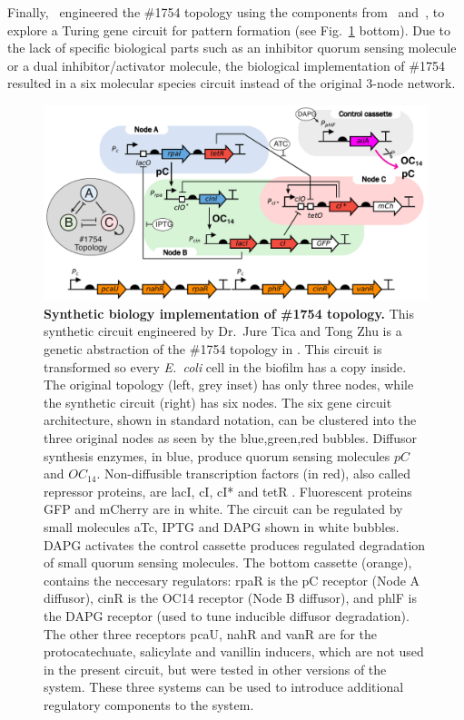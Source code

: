 Finally,~\cite{Tica2020} engineered the \#1754 topology using the components from~\cite{Meyer2019} and~\cite{Du2020}, to explore a Turing gene circuit for pattern formation (see Fig.~\ref{fig:synthetic circuit} bottom).
Due to the lack of specific biological parts such as an inhibitor quorum sensing molecule or a dual inhibitor/activator molecule, the biological implementation of \#1754 resulted in a six molecular species circuit instead of the original 3-node network.

\begin{figure}[H]
    \centering
    \includegraphics[width=1\textwidth]{chapters/Chapter 2/synthetic circuit2}
    \caption{\textbf{Synthetic biology implementation of \#1754 topology.} This synthetic circuit
    engineered by Dr.~Jure Tica and Tong Zhu is a genetic abstraction of the \#1754 topology in \cite{Scholes2019}.
    This circuit is transformed so every \textit{E.~coli} cell in the biofilm has a copy inside.
    The original topology (left, grey inset) has only three nodes, while the synthetic circuit (right) has six nodes.
    The six gene circuit architecture, shown in standard notation, can be clustered into the three original nodes
    as seen by the blue,green,red bubbles.
    Diffusor synthesis enzymes, in blue, produce quorum sensing molecules $pC$ and $OC_{14}$.
    Non-diffusible transcription
    factors (in red), also called repressor proteins, are lacI, cI, cI* and tetR .
    Fluorescent proteins GFP and mCherry are in white.
    The circuit can be regulated by small molecules aTc, IPTG and DAPG shown in white bubbles.
    DAPG activates the control cassette produces regulated degradation of small quorum sensing molecules.
    The bottom cassette (orange), contains the neccesary regulators:
    rpaR is the pC receptor (Node A diffusor), cinR is the OC14 receptor (Node B diffusor),
        and phlF is the DAPG receptor (used to tune inducible diffusor degradation).
        The other three receptors pcaU, nahR and vanR are for the protocatechuate, salicylate and vanillin inducers,
        which are not used in the present circuit, but were tested in other versions of the system.
        These three systems can be used to introduce additional regulatory components to the system.}
    \label{fig:synthetic circuit}
\end{figure}

